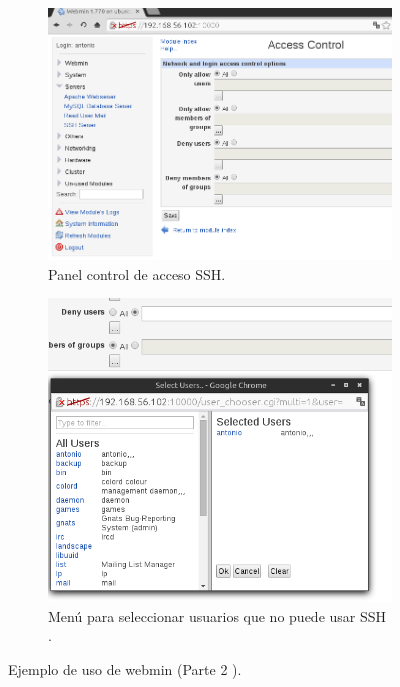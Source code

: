     \begin{figure}[H]
    \centering
     \begin{subfigure}[b]{0.7\textwidth}
        \includegraphics[width=\textwidth]{imagenes/img27}
    \caption{Panel control de acceso SSH.} 
    \label{fig24} 
    \end{subfigure}
    
    \begin{subfigure}[b]{0.7\textwidth}
       \includegraphics[width=\textwidth]{imagenes/img28}
    \caption{Menú para seleccionar usuarios que no puede usar SSH .} 
    \label{fig25} 
    \end{subfigure}
    \caption{Ejemplo de uso de webmin (Parte 2 ).}  

\end{figure}






